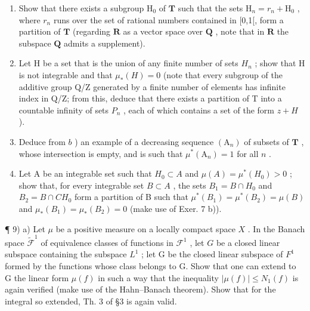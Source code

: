 \begin{enumerate}
\def\labelenumi{\alph{enumi})}
\item
  Show that there exists a subgroup \(\mathrm{H}_0\) of \(\mathbf{T}\) such that the sets \(\mathrm{H}_n = r_n + \mathrm{H}_0\) , where \(r_n\) runs over the set of rational numbers contained in {[}0,1{[}, form a partition of \(\mathbf{T}\) (regarding \(\mathbf{R}\) as a vector space over \(\mathbf{Q}\) , note that in \(\mathbf{R}\) the subspace \(\mathbf{Q}\) admits a supplement).
\item
  Let H be a set that is the union of any finite number of sets \(H_{n}\) ; show that H is not integrable and that \(\mu_{*}(H)=0\) (note that every subgroup of the additive group Q/Z generated by a finite number of elements has infinite index in Q/Z; from this, deduce that there exists a partition of T into a countable infinity of sets \(P_{n}\) , each of which contains a set of the form \(z+H\) ).
\item
  Deduce from \(b\) ) an example of a decreasing sequence \((\mathrm{A}_n)\) of subsets of \(\mathbf{T}\) , whose intersection is empty, and is such that \(\mu^{*}(\mathrm{A}_{n}) = 1\) for all \(n\) .
\item
  Let A be an integrable set such that \(H_{0} \subset A\) and \(\mu(A) = \mu^{*}(H_{0}) > 0\) ; show that, for every integrable set \(B \subset A\) , the sets \(B_{1} = B \cap H_{0}\) and \(B_{2} = B \cap C H_{0}\) form a partition of B such that \(\mu^{*}(B_{1}) = \mu^{*}(B_{2}) = \mu(B)\) and \(\mu_{*}(B_{1}) = \mu_{*}(B_{2}) = 0\) (make use of Exer. 7 b)).
\end{enumerate}

¶ 9) a) Let \(\mu\) be a positive measure on a locally compact space \(X\) . In the Banach space \(\widetilde{\mathcal{F}}^1\) of equivalence classes of functions in \(\mathcal{F}^1\) , let \(G\) be a closed linear subspace containing the subspace \(L^{1}\) ; let G be the closed linear subspace of \(F^{1}\) formed by the functions whose class belongs to G. Show that one can extend to G the linear form \(\mu(f)\) in such a way that the inequality \(|\mu(f)| \leqslant N_{1}(f)\) is again verified (make use of the Hahn--Banach theorem). Show that for the integral so extended, Th. 3 of §3 is again valid.

